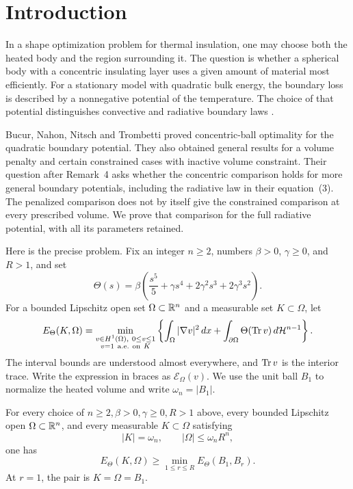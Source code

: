 \section{Introduction}\label{sec:introduction}

In a shape optimization problem for thermal insulation, one may choose
both the heated body and the region surrounding it. The question is
whether a spherical body with a concentric insulating layer uses a
given amount of material most efficiently. For a stationary model
with quadratic bulk energy, the boundary loss is described by a
nonnegative potential of the temperature. The choice of that
potential distinguishes convective and radiative boundary laws
\cite{BNNT}.

Bucur, Nahon, Nitsch and Trombetti \cite{BNNT} proved concentric-ball
optimality for the quadratic boundary potential. They also obtained
general results for a volume penalty and certain constrained cases
with inactive volume constraint. Their question after Remark~4 asks
whether the concentric comparison holds for more general boundary
potentials, including the radiative law in their equation~(3).
The penalized comparison does not by itself give the constrained
comparison at every prescribed volume. We prove that comparison
for the full radiative potential, with all its parameters retained.

Here is the precise problem. Fix an integer \(n\ge2\), numbers
\(\beta>0\), \(\gamma\ge0\), and \(R>1\), and set
\begin{equation}\label{eq:theta}
 \Theta(s)=\beta\left(\frac{s^5}{5}+\gamma s^4+
                                  2\gamma^2s^3+2\gamma^3s^2\right).
\end{equation}
For a bounded Lipschitz open set \(\Omega\subset\mathbb R^n\) and a measurable
set \(K\subset\Omega\), let
\begin{equation}\label{eq:energy}
 E_\Theta(K,\Omega)=
 \min_{\substack{v\in H^1(\Omega),\ 0\le v\le1\\
                         v=1\ {\rm a.e.\ on}\ K}}
 \left\{\int_\Omega|\nabla v|^2\,d x+
          \int_{\partial\Omega}\Theta(\operatorname{Tr} v)\,d\mathcal H^{n-1}\right\}.
\end{equation}
The interval bounds are understood almost everywhere, and \(\operatorname{Tr} v\)
is the interior trace. Write the expression in braces as
\(\mathcal E_\Omega(v)\). We use the unit ball \(B_1\) to normalize
the heated volume and write \(\omega_n=|B_1|\).

\begin{theorem}\label{thm:main}
For every choice of \(n\ge2,\beta>0,\gamma\ge0,R>1\) above, every bounded
Lipschitz open \(\Omega\subset\mathbb R^n\), and every measurable \(K\subset\Omega\)
satisfying
\[
 |K|=\omega_n,\qquad |\Omega|\le\omega_nR^n,
\]
one has
\begin{equation}\label{eq:main}
 E_\Theta(K,\Omega)\ge\min_{1\le r\le R}E_\Theta(B_1,B_r).
\end{equation}
At \(r=1\), the pair is \(K=\Omega=B_1\).
\end{theorem}

